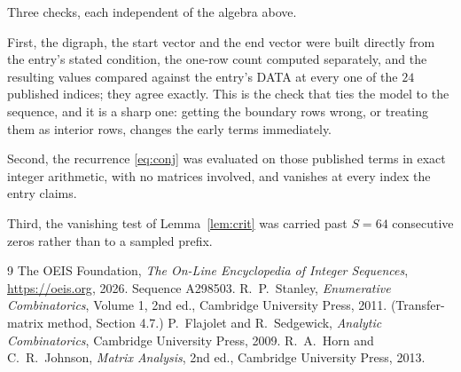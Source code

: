 \documentclass[11pt,a4paper]{article}
\theoremstyle{plain}
\theoremstyle{definition}
\begin{document}
Three checks, each independent of the algebra above.

First, the digraph, the start vector and the end vector were built directly from the
entry's stated condition, the one-row count computed separately, and the resulting values
compared against the entry's DATA at every one of the $24$ published indices; they
agree exactly. This is the check that ties the model to the sequence, and it is a sharp one:
getting the boundary rows wrong, or treating them as interior rows, changes the early terms
immediately.

Second, the recurrence \eqref{eq:conj} was evaluated on those published terms in exact
integer arithmetic, with no matrices involved, and vanishes at every index the entry claims.

Third, the vanishing test of Lemma~\ref{lem:crit} was carried past $S=64$ consecutive
zeros rather than to a sampled prefix.

\begin{thebibliography}{9}
 The OEIS Foundation, \emph{The On-Line Encyclopedia of Integer
Sequences}, \url{https://oeis.org}, 2026. Sequence A298503.
 R.~P.~Stanley, \emph{Enumerative Combinatorics}, Volume 1, 2nd ed.,
Cambridge University Press, 2011. (Transfer-matrix method, Section 4.7.)
 P.~Flajolet and R.~Sedgewick, \emph{Analytic Combinatorics}, Cambridge
University Press, 2009.
 R.~A.~Horn and C.~R.~Johnson, \emph{Matrix Analysis}, 2nd ed., Cambridge
University Press, 2013.
\end{thebibliography}
\end{document}
